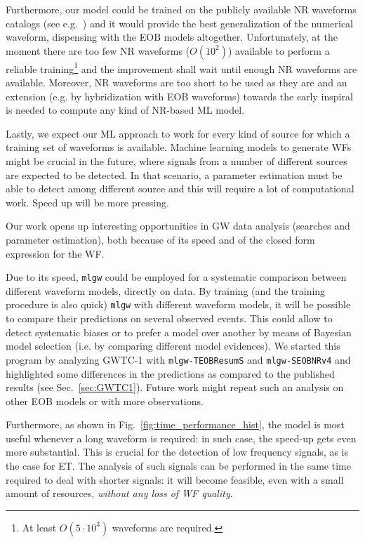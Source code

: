 Furthermore, our model could be trained on the publicly available NR waveforms 
catalogs (see e.g.~\cite{Mroue:2013xna,Boyle:2019kee,Healy:2019jyf}) and it would provide the best generalization of 
the numerical waveform, dispensing with the EOB models altogether.
Unfortunately, at the moment there are too few NR waveforms ($O(10^2)$) available to perform a reliable 
training\footnote{At least $O(5\cdot 10^3)$ waveforms are required.}
and the improvement shall wait until enough NR waveforms are available.
Moreover, NR waveforms are too short to be used as they are and an extension (e.g. by hybridization with EOB waveforms)
towards the early inspiral is needed to compute any kind of NR-based ML model.

Lastly, we expect our ML approach to work for every kind of source for which a training set of 
waveforms is available. Machine learning models to generate WFs might be crucial in 
the future, where signals from a number of different sources are expected to be detected. In that scenario, 
a parameter estimation must be able to detect among different source and this will require a lot 
of computational work. Speed up will be more pressing.


Our work opens up interesting opportunities in GW data analysis (searches and parameter estimation), 
both because of its speed and of the closed form expression for the WF.

Due to its speed, \texttt{mlgw} could be employed for a systematic comparison between different waveform models, directly on data.
By training (and the training procedure is also quick) \texttt{mlgw} with different waveform models, it will be possible to compare their predictions on several observed events. This could allow to detect systematic biases or to prefer a model over another by means of Bayesian model selection (i.e. by comparing different model evidences).
We started this program by analyzing GWTC-1 with \texttt{mlgw-TEOBResumS} and \texttt{mlgw-SEOBNRv4} and 
highlighted some differences in the predictions as compared to the published results (see Sec.~\ref{sec:GWTC1}). 
Future work might repeat such an analysis on other EOB models or with more observations.

Furthermore, as shown in Fig.~\ref{fig:time_performance_hist}, the model is most useful whenever a long 
waveform is required: in such case, the speed-up gets even more substantial. This is crucial for the detection 
of low frequency signals, as is the case for ET. The analysis of such signals can be performed in the same time 
required to deal with shorter signals: it will become feasible, even with a small amount of resources, 
\textit{without any loss of WF quality}.

